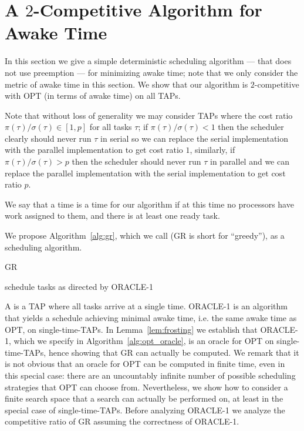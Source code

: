 \section{A $2$-Competitive Algorithm for Awake Time} 
In this section we give a simple deterministic scheduling
algorithm --- that does not use preemption --- for minimizing
awake time; note that we only consider the metric of awake time
in this section. We show that our algorithm is $2$-competitive
with OPT (in terms of awake time) on all TAPs.

Note that without loss of generality we may consider TAPs where
the cost ratio $\pi(\tau)/\sigma(\tau) \in [1,p]$ for all tasks
$\tau$; if $\pi(\tau)/\sigma(\tau) < 1$ then the scheduler
clearly should never run $\tau$ in serial so we can replace the
serial implementation with the parallel implementation to get
cost ratio $1$, similarly, if $\pi(\tau)/\sigma(\tau) > p$ then
the scheduler should never run $\tau$ in parallel and we can
replace the parallel implementation with the serial
implementation to get cost ratio $p$.

We say that a time is a  time for our algorithm if at
this time no processors have work assigned to them, and there is at
least one ready task.

We propose Algorithm~\ref{alg:gr}, which we call 
(GR is short for \enquote{greedy}), as a scheduling algorithm.

\begin{algorithm}
  \caption{GR}
  \label{alg:gr}
  \begin{algorithmic}
        \State schedule tasks as directed by ORACLE-1 
      \EndIf
    \EndWhile
  \end{algorithmic}
\end{algorithm}

A  is a TAP where all tasks arrive at a
single time. ORACLE-1 is an algorithm that yields a schedule
achieving minimal awake time, i.e. the same awake time as OPT,
on single-time-TAPs. In Lemma~\ref{lem:frosting} we establish
that ORACLE-1, which we specify in
Algorithm~\ref{alg:opt_oracle}, is an oracle for OPT on
single-time-TAPs, hence showing that GR can actually be computed.
We remark that it is not obvious that an oracle for OPT can be
computed in finite time, even in this special case: there are an
uncountably infinite number of possible scheduling strategies
that OPT can choose from. Nevertheless, we show how to consider a
finite search space that a search can actually be performed on,
at least in the special case of single-time-TAPs. Before
analyzing ORACLE-1 we analyze the competitive ratio of GR
assuming the correctness of ORACLE-1. 

